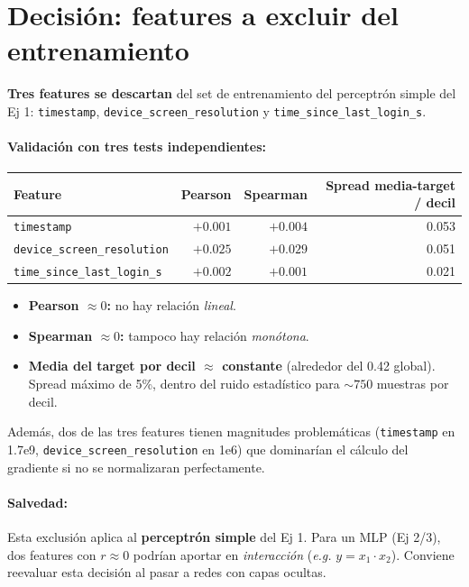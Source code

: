 \documentclass[11pt,a4paper]{article}
\begin{document}
\section{Decisi\'on: features a excluir del entrenamiento}

\textbf{Tres features se descartan} del set de entrenamiento del perceptr\'on
simple del Ej 1: \texttt{timestamp}, \texttt{device\_screen\_resolution} y
\texttt{time\_since\_last\_login\_s}.

\paragraph{Validaci\'on con tres tests independientes:}

\begin{center}
\begin{tabular}{l r r r}
\toprule
\textbf{Feature} & \textbf{Pearson} & \textbf{Spearman} & \textbf{Spread media-target / decil} \\
\midrule
\texttt{timestamp}                  & $+0.001$ & $+0.004$ & 0.053 \\
\texttt{device\_screen\_resolution} & $+0.025$ & $+0.029$ & 0.051 \\
\texttt{time\_since\_last\_login\_s} & $+0.002$ & $+0.001$ & 0.021 \\
\bottomrule
\end{tabular}
\end{center}

\begin{itemize}[leftmargin=*, itemsep=2pt, topsep=2pt]
    \item \textbf{Pearson $\approx 0$:} no hay relaci\'on \emph{lineal}.
    \item \textbf{Spearman $\approx 0$:} tampoco hay relaci\'on \emph{mon\'otona}.
    \item \textbf{Media del target por decil $\approx$ constante} (alrededor del 0.42 global).
          Spread m\'aximo de 5\%, dentro del ruido estad\'istico para $\sim 750$ muestras por decil.
\end{itemize}

Adem\'as, dos de las tres features tienen magnitudes problem\'aticas (\texttt{timestamp}
en 1.7e9, \texttt{device\_screen\_resolution} en 1e6) que dominar\'ian el c\'alculo
del gradiente si no se normalizaran perfectamente.

\paragraph{Salvedad:} Esta exclusi\'on aplica al \textbf{perceptr\'on simple} del Ej 1.
Para un MLP (Ej 2/3), dos features con $r \approx 0$ podr\'ian aportar en
\emph{interacci\'on} (\textit{e.g.} $y = x_1 \cdot x_2$). Conviene reevaluar esta
decisi\'on al pasar a redes con capas ocultas.
\end{document}
